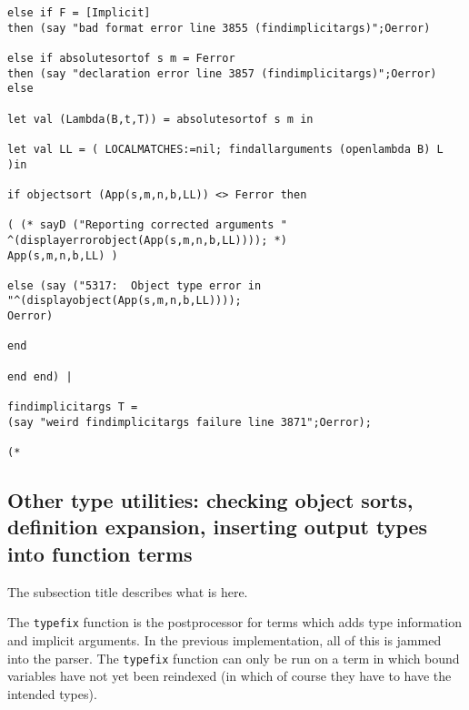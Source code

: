 \documentclass[12pt]{article}
\begin{document}
\begin{verbatim}
else if F = [Implicit] 
then (say "bad format error line 3855 (findimplicitargs)";Oerror)

else if absolutesortof s m = Ferror 
then (say "declaration error line 3857 (findimplicitargs)";Oerror) else

let val (Lambda(B,t,T)) = absolutesortof s m in

let val LL = ( LOCALMATCHES:=nil; findallarguments (openlambda B) L )in

if objectsort (App(s,m,n,b,LL)) <> Ferror then

( (* sayD ("Reporting corrected arguments "
^(displayerrorobject(App(s,m,n,b,LL)))); *)
App(s,m,n,b,LL) )

else (say ("5317:  Object type error in "^(displayobject(App(s,m,n,b,LL))));
Oerror)

end

end end) |

findimplicitargs T = 
(say "weird findimplicitargs failure line 3871";Oerror);

(*

\end{verbatim}

\subsection{Other type utilities:  checking object sorts, definition expansion, inserting output types into function terms}

The subsection title describes what is here.

The {\tt typefix} function is the postprocessor for terms which adds type information and implicit arguments.  In the previous implementation,
all of this is jammed into the parser.  The {\tt typefix} function can only be run on a term in which bound variables have not yet been reindexed (in which
of course they have to have the intended types).
\end{document}

